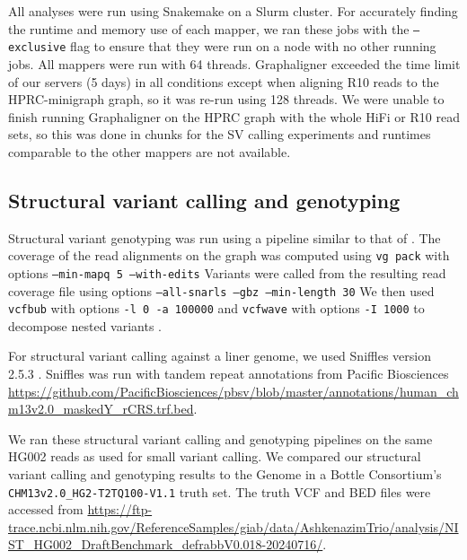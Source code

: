 \documentclass[11pt]{ucscthesis}
\begin{document}
All analyses were run using Snakemake on a Slurm cluster.
For accurately finding the runtime and memory use of each mapper, we ran these jobs with the \texttt{--exclusive} flag to ensure that they were run on a node with no other running jobs.
All mappers were run with 64 threads.
Graphaligner exceeded the time limit of our servers (5 days) in all conditions except when aligning R10 reads to the HPRC-minigraph graph, so it was re-run using 128 threads. 
We were unable to finish running Graphaligner on the HPRC graph with the whole HiFi or R10 read sets, so this was done in chunks for the SV calling experiments and runtimes comparable to the other mappers are not available.


\subsection{Structural variant calling and genotyping}
\label{sec:sup-svs}
Structural variant genotyping was run using a pipeline similar to that of \citet{hickey_vgsv_2020}.
The coverage of the read alignments on the graph was computed using  \texttt{vg pack} with options \texttt{--min-mapq 5 --with-edits}
Variants were called from the resulting read coverage file using options \texttt{--all-snarls --gbz --min-length 30}
We then used \texttt{vcfbub} with options \texttt{-l 0 -a 100000} and \texttt{vcfwave} with options \texttt{-I 1000} to decompose nested variants \cite{garrison_vcflib_2022}.

For structural variant calling against a liner genome, we used Sniffles version 2.5.3 \cite{sedlazeck_sniffles_2018,smolka_sniffles2_2024}.
Sniffles was run with tandem repeat annotations from Pacific Biosciences \url{https://github.com/PacificBiosciences/pbsv/blob/master/annotations/human_chm13v2.0_maskedY_rCRS.trf.bed}.

We ran these structural variant calling and genotyping pipelines on the same HG002 reads as used for small variant calling.
We compared our structural variant calling and genotyping results to the Genome in a Bottle Consortium's \texttt{CHM13v2.0\_HG2-T2TQ100-V1.1} truth set.
The truth VCF and BED files were accessed from \url{https://ftp-trace.ncbi.nlm.nih.gov/ReferenceSamples/giab/data/AshkenazimTrio/analysis/NIST_HG002_DraftBenchmark_defrabbV0.018-20240716/}.
\end{document}
